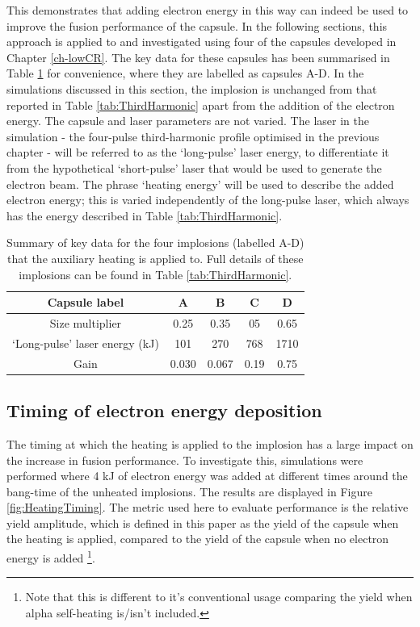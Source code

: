 This demonstrates that adding electron energy in this way can indeed be used to improve the fusion performance of the capsule. In the following sections, this approach is applied to and investigated using four of the capsules developed in Chapter \ref{ch-lowCR}. The key data for these capsules has been summarised in Table \ref{tab:Heating capsules} for convenience, where they are labelled as capsules A-D. In the simulations discussed in this section, the implosion is unchanged from that reported in Table \ref{tab:ThirdHarmonic} apart from the addition of the electron energy. The capsule and laser parameters are not varied. The laser in the simulation - the four-pulse third-harmonic profile optimised in the previous chapter - will be referred to as the `long-pulse' laser energy, to differentiate it from the hypothetical `short-pulse' laser that would be used to generate the electron beam. The phrase `heating energy' will be used to describe the added electron energy; this is varied independently of the long-pulse laser, which always has the energy described in Table \ref{tab:ThirdHarmonic}.

\begin{table}
\centering
\begin{tabular}{|c|c|c|c|c|}
\hline
Capsule label &  A & B & C & D \\ 
\hline
Size multiplier & 0.25 & 0.35 & 05 & 0.65 \\
`Long-pulse' laser energy (kJ) & 101  & 270 & 768 & 1710 \\ 
Gain & 0.030 & 0.067 & 0.19 & 0.75\\ 
\hline
  \end{tabular}
  \caption{Summary of key data for the four implosions (labelled A-D) that the auxiliary heating is applied to. Full details of these implosions can be found in Table \ref{tab:ThirdHarmonic}.}
  \label{tab:Heating capsules}
\end{table}

\subsection{Timing of electron energy deposition}

The timing at which the heating is applied to the implosion has a large impact on the increase in fusion performance. To investigate this, simulations were performed where 4 kJ of electron energy was added at different times around the bang-time of the unheated implosions. The results are displayed in Figure \ref{fig:HeatingTiming}. The metric used here to evaluate performance is the relative yield amplitude, which is defined in this paper as the yield of the capsule when the heating is applied, compared to the yield of the capsule when no electron energy is added \footnote{Note that this is different to it's conventional usage comparing the yield when alpha self-heating is/isn't included.}.

